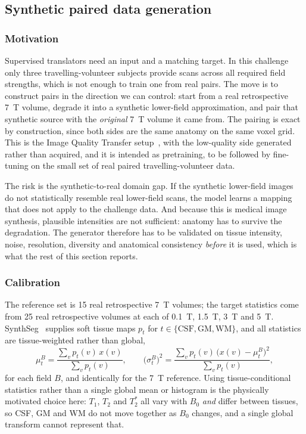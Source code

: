 \documentclass[11pt,a4paper]{article}
\begin{document}
\subsection{Synthetic paired data generation}
\label{sec:synth}

\subsubsection{Motivation}

Supervised translators need an input and a matching target. In this challenge only three
travelling-volunteer subjects provide scans across all required field strengths, which is not enough to
train one from real pairs. The move is to construct pairs in the direction we can control: start from a
real retrospective \SI{7}{\tesla} volume, degrade it into a synthetic lower-field approximation, and pair
that synthetic source with the \emph{original} \SI{7}{\tesla} volume it came from. The pairing is exact
by construction, since both sides are the same anatomy on the same voxel grid. This is the Image Quality
Transfer setup~\cite{alexander2017iqt}, with the low-quality side generated rather than acquired, and it
is intended as pretraining, to be followed by fine-tuning on the small set of real paired
travelling-volunteer data.

The risk is the synthetic-to-real domain gap. If the synthetic lower-field images do not statistically
resemble real lower-field scans, the model learns a mapping that does not apply to the challenge data.
And because this is medical image synthesis, plausible intensities are not sufficient: anatomy has to
survive the degradation. The generator therefore has to be validated on tissue intensity, noise,
resolution, diversity and anatomical consistency \emph{before} it is used, which is what the rest of this
section reports.

\subsubsection{Calibration}

The reference set is 15 real retrospective \SI{7}{\tesla} volumes; the target statistics come from 25
real retrospective volumes at each of \SI{0.1}{\tesla}, \SI{1.5}{\tesla}, \SI{3}{\tesla} and
\SI{5}{\tesla}. SynthSeg~\cite{billot2023synthseg} supplies soft tissue maps $p_t$ for
$t \in \{\text{CSF}, \text{GM}, \text{WM}\}$, and all statistics are tissue-weighted rather than global,
\begin{equation}
  \mu^{B}_{t} = \frac{\sum_v p_t(v)\,x(v)}{\sum_v p_t(v)},
  \qquad
  \big(\sigma^{B}_{t}\big)^2
    = \frac{\sum_v p_t(v)\,\big(x(v) - \mu^{B}_{t}\big)^2}{\sum_v p_t(v)},
\end{equation}
for each field $B$, and identically for the \SI{7}{\tesla} reference. Using tissue-conditional statistics
rather than a single global mean or histogram is the physically motivated choice here: $T_1$, $T_2$ and
$T_2^\ast$ all vary with $B_0$ \emph{and} differ between tissues, so CSF, GM and WM do not move together
as $B_0$ changes, and a single global transform cannot represent that.
\end{document}
